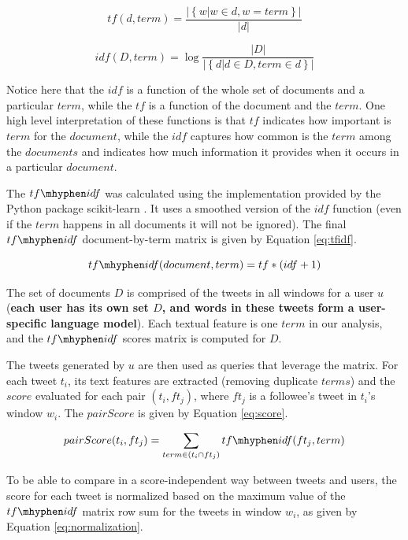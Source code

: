 \begin{equation}
tf(d,term) = \frac{|\left\{w| w \in d, w = term\right\}|}{|d|}
\label{eq:tf}
\end{equation}

\begin{equation}
idf(D,term) = \log \frac{|D|}{|\left\{d| d \in D, term \in d\right\}|}
\label{eq:idf}
\end{equation}

Notice here that the $idf$ is a function of the whole set of documents and a particular $term$, while the $tf$ is a function of the document and the $term$.
One high level interpretation of these functions is that $tf$ indicates how important is $term$ for the $document$, while the $idf$ captures how common is the $term$ among the $documents$ and indicates how much information it provides when it occurs in a particular $document$.

The $tf\mhyphen idf$ was calculated using the implementation provided by the Python package scikit-learn \cite{scikit-learn}. It uses a smoothed version of the $idf$ function (even if the $term$ happens in all documents it will not be ignored). The final $tf\mhyphen idf$ document-by-term matrix is given by Equation \ref{eq:tfidf}.

\begin{equation}
tf\mhyphen idf(document,term) = tf*(idf + 1)
\label{eq:tfidf}
\end{equation}

The set of documents $D$ is comprised of the tweets in all windows for a user $u$ (\textbf{each user has its own set $D$, and words in these tweets form a user-specific language model}). Each textual feature is one $term$ in our analysis, and the $tf\mhyphen idf$ scores matrix is computed for $D$. 

The tweets generated by $u$ are then used as queries that leverage the matrix.  For each tweet $t_i$, its text features are extracted (removing duplicate $terms$) and the $score$ evaluated for each pair $(t_i,ft_j)$, where $ft_j$ is a followee's tweet in $t_i$'s window $w_i$. The $pairScore$ is given by Equation \ref{eq:score}.

\begin{equation}
pairScore(t_i,ft_j) = \sum_{term \in \left(t_i \cap ft_j\right)}{tf\mhyphen idf(ft_j,term)}
\label{eq:score}
\end{equation}

To be able to compare in a score-independent way between tweets and users, the score for each tweet is normalized based on the maximum value of the $tf\mhyphen idf$ matrix row sum for the tweets in window $w_i$, as given by Equation \ref{eq:normalization}.

